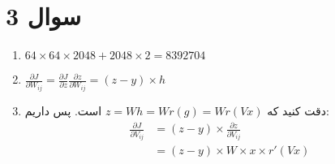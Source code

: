 \section*{سوال 3}
\begin{enumerate}
    \item $64 \times 64 \times 2048 + 2048 \times 2 = 8392704$
    \item $\frac{\partial J}{\partial W_{ij}} = \frac{\partial J}{\partial z}\frac{\partial z}{\partial W_{ij}} = (z - y) \times h$
    \item دقت کنید که
    $z = Wh = W r(g) = W r(Vx)$
    است. پس داریم:
    \begin{align*}
        \frac{\partial J}{\partial V_{ij}} &= (z - y) \times \frac{\partial z}{\partial V_{ij}} \\
        &= (z - y) \times W \times x \times r'(Vx)    
    \end{align*}
\end{enumerate}